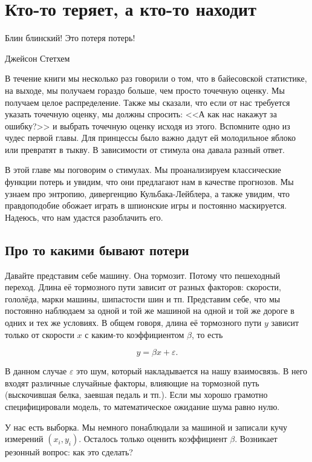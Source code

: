 \documentclass[12pt, a4paper, oneside]{extreport}
\def \b{\beta}
\def \e{\varepsilon}
\theoremstyle{plain}              %
\theoremstyle{definition}         %
\begin{document}
	


\chapter{Кто-то теряет, а кто-то находит} 

\epigraph{Блин блинский! Это потеря потерь!}{Джейсон Стетхем}

В течение книги мы несколько раз говорили о том, что в байесовской статистике, на выходе, мы получаем гораздо больше, чем просто точечную оценку. Мы получаем целое распределение.  Также мы сказали, что если от нас требуется указать точечную оценку, мы должны спросить: <<А как нас накажут за ошибку?>> и выбрать точечную оценку исходя из этого. Вспомните одно из чудес первой главы. Для принцессы было важно дадут ей молодильное яблоко или превратят в тыкву. В зависимости от стимула она давала разный ответ. 

В этой главе мы поговорим о стимулах. Мы проанализируем классические функции потерь и увидим, что они предлагают нам в качестве прогнозов. Мы узнаем про энтропию, дивергенцию Кульбака-Лейблера, а также увидим, что правдоподобие обожает играть в шпионские игры и постоянно маскируется. Надеюсь, что нам удастся разоблачить его. 

\section{Про то какими бывают потери} 

Давайте представим себе машину. Она тормозит. Потому что пешеходный переход. Длина её тормозного пути зависит от разных факторов: скорости, гололёда, марки машины, шипастости шин и тп. Представим себе, что мы постоянно наблюдаем за одной и той же машиной на одной и той же дороге в одних и тех же условиях. В общем говоря, длина её тормозного пути $y$ зависит только от скорости $x$ с каким-то коэффициентом $\b$, то есть 

\[ y = \beta x + \e. \]

В данном случае $\e$ это шум, который накладывается на нашу взаимосвязь. В него входят различные случайные факторы, влияющие на тормозной путь (выскочившая белка, заевшая педаль и тп.).  Если мы хорошо грамотно специфицировали модель, то математическое ожидание шума равно нулю. 

У нас есть выборка. Мы немного понаблюдали за машиной и записали кучу измерений $(x_i, y_i)$. Осталось только оценить коэффициент $\beta$.  Возникает резонный вопрос: как это сделать?
\end{document}

